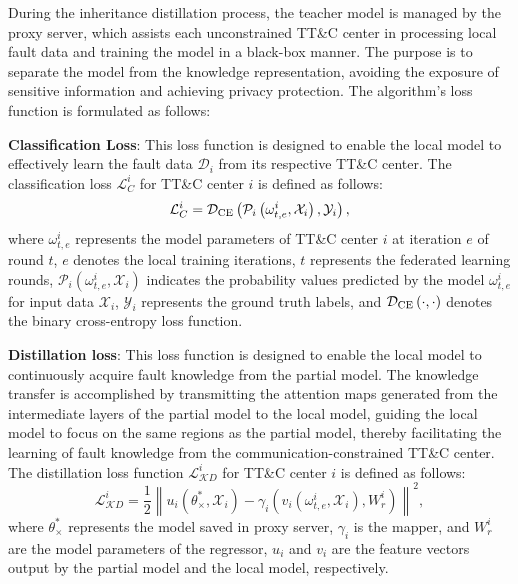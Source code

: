During the inheritance distillation process, the teacher model is managed by the proxy server, 
which assists each unconstrained TT\&C center in processing local fault data and training the model in a black-box manner. 
The purpose is to separate the model from the knowledge representation, avoiding the exposure of sensitive information and achieving privacy protection. 
The algorithm's loss function is formulated as follows:

\textbf{Classification Loss}: This loss function is designed to enable the local model to effectively learn the fault data ${{\mathscr D}_i}$ from its respective TT\&C center. 
The classification loss $\mathcal L_C^i$ for TT\&C center $i$ is defined as follows:
\begin{equation}
	\label{eq: LCi}
	\mathcal L_C^i = {{\mathcal D}_{\rm{CE}}}\left( {{\mathcal P_i}\left( {\omega _{t,e}^i,{\mathcal X_i}} \right),{\mathcal Y_i}} \right),
\end{equation}
\noindent where $\omega _{t,e}^i$ represents the model parameters of TT\&C center $i$ at iteration $e$ of round $t$, 
$e$ denotes the local training iterations, 
$t$ represents the federated learning rounds, 
${\mathcal P_i}\left( {\omega _{t,e}^i, {\mathcal X_i}} \right)$ indicates the probability values predicted by the model $\omega _{t,e}^i$ for input data ${\mathcal X_i}$, 
${\mathcal Y_i}$ represents the ground truth labels, 
and ${{\mathcal D}_{\rm{CE}}}\left( { \cdot ,\cdot } \right)$ denotes the binary cross-entropy loss function.

\textbf{Distillation loss}: This loss function is designed to enable the local model to continuously acquire fault knowledge from the partial model. 
The knowledge transfer is accomplished by transmitting the attention maps generated from the intermediate layers of the partial model to the local model, 
guiding the local model to focus on the same regions as the partial model, 
thereby facilitating the learning of fault knowledge from the communication-constrained TT\&C center.
The distillation loss function $\mathcal L_{\mathcal KD}^i$ for TT\&C center $i$ is defined as follows:
\begin{equation}
	\label{eq: LKDi}
	\mathcal L_{\mathcal KD}^i = \frac{1}{2}{\left\| {{u_i}\left( {\theta _ \times ^ * ,{\mathcal  X_i}} \right) - {\gamma _i}\left( {{v_i}\left( {\omega _{t,e}^i,{\mathcal  X_i}} \right),W_r^i} \right)} \right\|^2},
\end{equation}
\noindent where $\theta _ \times ^ * $ represents the model saved in proxy server, 
$\gamma_i$ is the mapper, and $W^i_r$ are the model parameters of the regressor,
${u_i}$ and ${v_i}$ are the feature vectors output by the partial model and the local model, respectively. 

